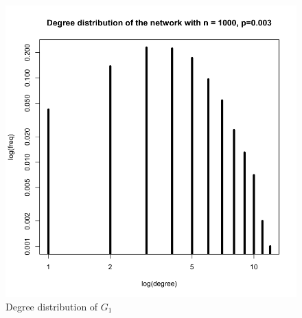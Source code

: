 \documentclass[draftcls,12pt,onecolumn]{IEEEtran}
\begin{document}
\begin{figure}[H]
\begin{minipage}[t]{0.48\textwidth}
\includegraphics[scale=0.2]{figures_part1_1/output_8_0.png}
\caption{Degree distribution of $G_1$}
\label{fig2}
\end{minipage}
\end{figure}
\end{document}
